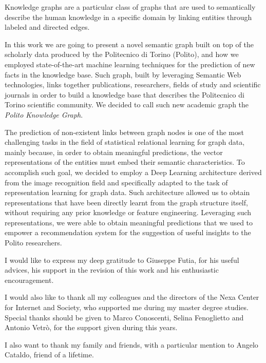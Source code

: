 \documentclass[%
    corpo=13.5pt,
    twoside,
    oldstyle,
    tipotesi=magistrale,
    greek,
    evenboxes
]{toptesi}
\begin{document}
Knowledge graphs are a particular class of graphs that are used to
semantically describe the human knowledge in a specific domain by linking
entities through labeled and directed edges.

In this work we are going to present a novel semantic graph built on top of the
scholarly data produced by the Politecnico di Torino (Polito), and how we
employed state-of-the-art machine learning techniques for the prediction
of new facts in the knowledge base.
Such graph, built by leveraging Semantic Web technologies, links together
publications, researchers, fields of study and scientific journals in order
to build a knowledge base that describes the Politecnico di Torino scientific
community.
We decided to call such new academic graph the \emph{Polito Knowledge Graph}.

The prediction of non-existent links between graph nodes is one of the
most challenging tasks in the field of statistical relational learning for graph
data, mainly because, in order to obtain meaningful predictions, the vector
representations of the entities must embed their semantic characteristics.
To accomplish such goal, we decided to employ a Deep Learning architecture derived
from the image recognition field and specifically adapted to the task of
representation learning for graph data.
Such architecture allowed us to obtain representations that have been
directly learnt from the graph structure itself, without requiring any prior
knowledge or feature engineering.
Leveraging such representations, we were able to obtain meaningful predictions
that we used to empower a recommendation system for the suggestion of useful
insights to the Polito researchers.

\ringraziamenti

I would like to express my deep gratitude to Giuseppe Futia, for his useful
advices, his support in the revision of this work and his enthusiastic
encouragement.

I would also like to thank all my colleagues and the directors of the
Nexa Center for Internet and Society, who supported me during my master
degree studies.
Special thanks should be given to Marco Conoscenti, Selina Fenoglietto and
Antonio Vetrò, for the support given during this years.

I also want to thank my family and friends, with a particular mention to
Angelo Cataldo, friend of a lifetime.
\end{document}
